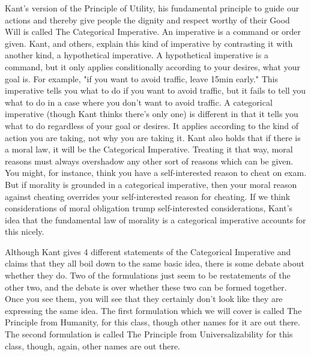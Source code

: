 Kant's version of the Principle of Utility, his fundamental principle to guide our actions and thereby give people the dignity and respect worthy of their Good Will is called The Categorical Imperative. An imperative is a command or order given. Kant, and others, explain this kind of imperative by contrasting it with another kind, a hypothetical imperative. A hypothetical imperative is a command, but it only applies conditionally according to your desires, what your goal is. For example, "if you want to avoid traffic, leave 15min early." This imperative tells you what to do if you want to avoid traffic, but it fails to tell you what to do in a case where you don't want to avoid traffic. A categorical imperative (though Kant thinks there's only one) is different in that it tells you what to do regardless of your goal or desires. It applies according to the kind of action you are taking, not why you are taking it. Kant also holds that if there is a moral law, it will be the Categorical Imperative. Treating it that way, moral reasons must always overshadow any other sort of reasons which can be given. You might, for instance, think you have a self-interested reason to cheat on exam. But if morality is grounded in a categorical imperative, then your moral reason against cheating overrides your self-interested reason for cheating. If we think considerations of moral obligation trump self-interested considerations, Kant’s idea that the fundamental law of morality is a categorical imperative accounts for this nicely.

Although Kant gives 4 different statements of the Categorical Imperative and claims that they all boil down to the same basic idea, there is some debate about whether they do. Two of the formulations just seem to be restatements of the other two, and the debate is over whether these two can be formed together. Once you see them, you will see that they certainly don't look like they are expressing the same idea. The first formulation which we will cover is called The Principle from Humanity, for this class, though other names for it are out there. The second formulation is called The Principle from Universalizability for this class, though, again, other names are out there.

